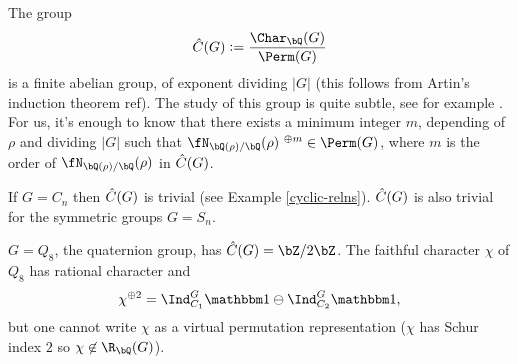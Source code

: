 

The group $$\C(G) \defeq \frac{\Char_{\bQ}(G)}{\Perm(G)}$$ is a finite abelian group, of exponent dividing $|G|$ (this follows from Artin's induction theorem {\color{red} ref}). The study of this group is quite subtle, see for example \cite{Tim-Alex}. For us, it's enough to know that there exists a minimum integer $m$, depending of $\rho$ and dividing $|G|$ such that $\repnorm{\rho}^{\ \oplus m } \in \Perm(G)$, where $m$ is the order of $\repnorm{\rho}$ in $\hat{C}(G)$. 
\begin{example}
If $G = C_n$ then $\hat{C}(G)$ is trivial (see Example \ref{cyclic-relns}). $\hat{C}(G)$ is also trivial for the symmetric groups $G = S_n$. 
\end{example}

 \begin{example}
    $G = Q_8$, the quaternion group, has $\C(G) = \bZ / 2 \bZ$. The faithful character $\chi$ of $Q_8$ has rational character and 
    \[ \chi^{\oplus 2} = \Ind_{C_1}^G \trivial \ominus \Ind_{C_2}^G \trivial, \]
    but one cannot write $\chi$ as a virtual permutation representation ($\chi$ has Schur index $2$ so $\chi \not\in \R_{\bQ}(G)$).  
 \end{example}


